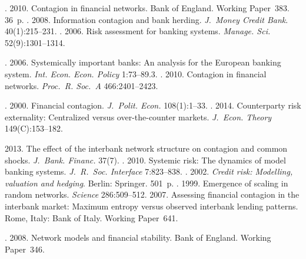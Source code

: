 \begin{multicols}{2}
{{\begin{thebibliography}{99}
. 2010.
Contagion in financial networks. Bank of England. Working 
Paper~383. 36~p.
. 2008.
Information contagion and bank herding. \textit{J.~Money Credit Bank}.   40(1):215--231.
. 2006. Risk assessment for banking systems. 
\textit{Manage. Sci.} 52(9):1301--1314.

. 2006.
Systemically important banks: An analysis 
for the European banking system. \textit{Int. Econ. Econ. Policy} 
1:73--89.3.
. 
2010. Contagion in financial networks. \textit{Proc.~R. Soc.~A} 466:2401--2423.  



. 
2000. Financial contagion. \textit{J.~Polit. Econ.} 108(1):1--33.
. 2014. Counterparty risk externality: Centralized 
versus over-the-counter markets. \textit{J.~Econ. Theory} 149(C):153--182.

 2013.  The effect of the interbank network structure on contagion and 
common shocks.  \textit{J.~Bank. Financ.} 37(7).  
. 2010. 
Systemic risk: The dynamics of model banking systems. 
\textit{J.~R.~Soc. Interface} 7:823--838.   
. 2002.
\textit{Credit risk: Modelling, valuation and hedging}. 
Berlin: Springer.  501~p.
. 
1999. Emergence of scaling in random networks. \textit{Science} 286:509--512.
 2007.
  Assessing financial contagion in the interbank market: Maximum 
entropy versus observed interbank lending patterns. Rome, Italy: Bank of 
Italy. Working Paper~641.
 
. 2008.
 Network models and financial 
stability.  Bank of England. Working Paper~346.




\end{thebibliography}}}
\end{multicols}

